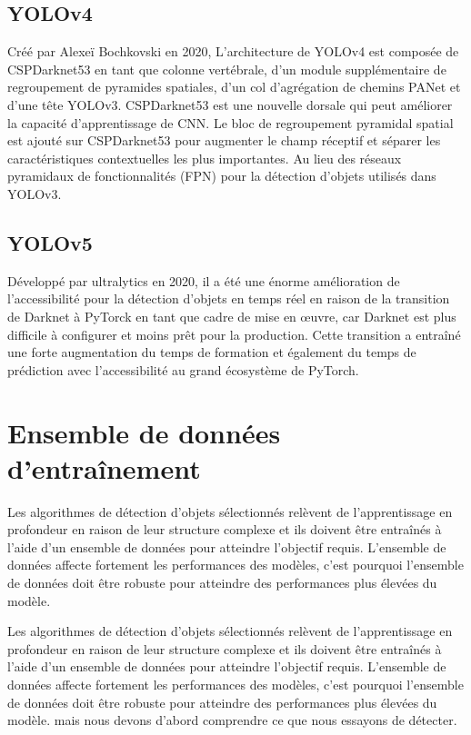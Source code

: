           \subsection{YOLOv4} Créé par Alexeï Bochkovski en 2020, L'architecture de YOLOv4 est composée de CSPDarknet53 en tant que colonne vertébrale, d'un module supplémentaire de regroupement de pyramides spatiales, d'un col d'agrégation de chemins PANet et d'une tête YOLOv3. CSPDarknet53 est une nouvelle dorsale qui peut améliorer la capacité d'apprentissage de CNN. Le bloc de regroupement pyramidal spatial est ajouté sur CSPDarknet53 pour augmenter le champ réceptif et séparer les caractéristiques contextuelles les plus importantes. Au lieu des réseaux pyramidaux de fonctionnalités (FPN) pour la détection d'objets utilisés dans YOLOv3.
          \subsection{YOLOv5} Développé par ultralytics en 2020, il a été une énorme amélioration de l'accessibilité pour la détection d'objets en temps réel en raison de la transition de Darknet à PyTorck en tant que cadre de mise en œuvre, car Darknet est plus difficile à configurer et moins prêt pour la production. Cette transition a entraîné une forte augmentation du temps de formation et également du temps de prédiction avec l'accessibilité au grand écosystème de PyTorch.

\section{Ensemble de données d'entraînement}
          Les algorithmes de détection d'objets sélectionnés relèvent de l'apprentissage en profondeur en raison de leur structure complexe et ils doivent être entraînés à l'aide d'un ensemble de données pour atteindre l'objectif requis. L'ensemble de données affecte fortement les performances des modèles, c'est pourquoi l'ensemble de données doit être robuste pour atteindre des performances plus élevées du modèle.

          Les algorithmes de détection d'objets sélectionnés relèvent de l'apprentissage en profondeur en raison de leur structure complexe et ils doivent être entraînés à l'aide d'un ensemble de données pour atteindre l'objectif requis. L'ensemble de données affecte fortement les performances des modèles, c'est pourquoi l'ensemble de données doit être robuste pour atteindre des performances plus élevées du modèle. mais nous devons d'abord comprendre ce que nous essayons de détecter.

